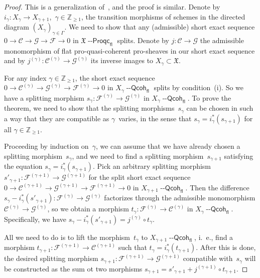 \documentclass[12pt,a4paper]{amsart}
\newcommand{\+}{\protect\nobreakdash-}
\renewcommand{\:}{\colon}
\newcommand{\rarrow}{\longrightarrow}
\newcommand{\Qcoh}{{\operatorname{\mathsf{--Qcoh}}}}
\newcommand{\Proqc}{{\operatorname{\mathsf{--Proqc}}}}
\newcommand{\fl}{\mathsf{fl}}
\newcommand{\fX}{\mathfrak X}
\newcommand{\rC}{\mathscr C}
\newcommand{\rF}{\mathscr F}
\newcommand{\rG}{\mathscr G}
\newcommand{\boZ}{\mathbb Z}
\theoremstyle{plain}
\theoremstyle{definition}
\begin{document}
\begin{proof}
 This is a generalization of~\cite[Lemma~8.5.7]{Pform}, and the proof
is similar.
 Denote by $i_\gamma\:X_\gamma\rarrow X_{\gamma+1}$,
\,$\gamma\in\boZ_{\ge1}$, the transition morphisms of schemes in
the directed diagram $(X_\gamma)_{\gamma\in\Gamma}$.
 We need to show that any (admissible) short exact sequence
$0\rarrow\rC\rarrow\rG\rarrow\rF\rarrow0$ in $\fX\Proqc_\fl$ splits.
 Denote by $j\:\rC\rarrow\rG$ the admissible monomorphism of flat
pro-quasi-coherent pro-sheaves in our short exact sequence and by
$j^{(\gamma)}\:\rC^{(\gamma)}\rarrow\rG^{(\gamma)}$ its inverse
images to $X_\gamma\subset\fX$.

 For any index $\gamma\in\boZ_{\ge1}$, the short exact sequence
$0\rarrow\rC^{(\gamma)}\rarrow\rG^{(\gamma)}\rarrow\rF^{(\gamma)}
\rarrow0$ in $X_\gamma\Qcoh_\fl$ splits by condition~(i).
 So we have a splitting morphism $s_\gamma\:\rF^{(\gamma)}\rarrow
\rG^{(\gamma)}$ in $X_\gamma\Qcoh_\fl$.
 To prove the theorem, we need to show that the splitting
morphisms~$s_\gamma$ can be chosen in such a way that they are
compatible as $\gamma$~varies, in the sense that
$s_\gamma=i_\gamma^*(s_{\gamma+1})$ for all $\gamma\in\boZ_{\ge1}$.

 Proceeding by induction on~$\gamma$, we can assume that we have
already chosen a splitting morphism~$s_\gamma$, and we need to find
a splitting morphism~$s_{\gamma+1}$ satisfying the equation
$s_\gamma=i_\gamma^*(s_{\gamma+1})$.
 Pick an arbitrary splitting morphism $s'_{\gamma+1}\:
\rF^{(\gamma+1)}\rarrow\rG^{(\gamma+1)}$ for the split short exact
sequence $0\rarrow\rC^{(\gamma+1)}\rarrow\rG^{(\gamma+1)}\rarrow
\rF^{(\gamma+1)}\rarrow0$ in $X_{\gamma+1}\Qcoh_\fl$.
 Then the difference $s_\gamma-i_\gamma^*(s'_{\gamma+1})\:\rF^{(\gamma)}
\rarrow\rG^{(\gamma)}$ factorizes through the admissible monomorphism
$\rC^{(\gamma)}\rarrow\rG^{(\gamma)}$, so we obtain a morphism
$t_\gamma\:\rF^{(\gamma)}\rarrow\rC^{(\gamma)}$ in $X_\gamma\Qcoh_\fl$.
 Specifically, we have $s_\gamma-i_\gamma^*(s'_{\gamma+1})=
j^{(\gamma)}\circ t_\gamma$.

 All we need to do is to lift the morphism~$t_\gamma$ to
$X_{\gamma+1}\Qcoh_\fl$, i.~e., find a morphism
$t_{\gamma+1}\:\rF^{(\gamma+1)}\rarrow\rC^{(\gamma+1)}$ such
that $t_\gamma=i_\gamma^*(t_{\gamma+1})$.
 After this is done, the desired splitting morphism
$s_{\gamma+1}\:\rF^{(\gamma+1)}\rarrow\rG^{(\gamma+1)}$ compatible
with~$s_\gamma$ will be constructed as the sum ot two morphisms
$s_{\gamma+1}=s'_{\gamma+1}+j^{(\gamma+1)}\circ t_{\gamma+1}$.


\end{proof}
\end{document}
